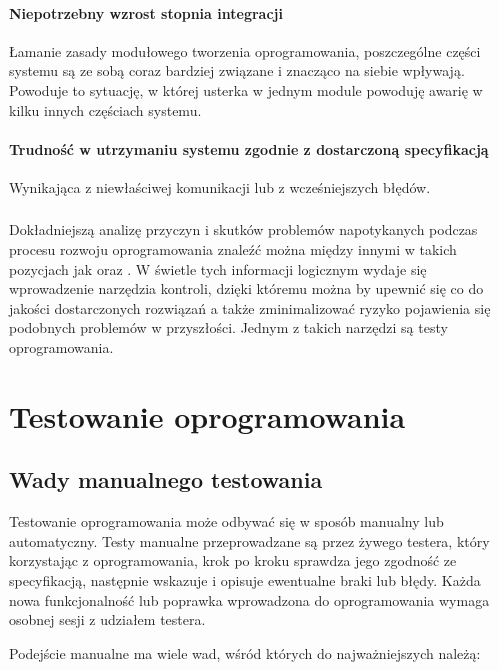 	  \paragraph{Niepotrzebny wzrost stopnia integracji}
	    Łamanie zasady modułowego tworzenia oprogramowania, poszczególne części systemu są ze sobą coraz bardziej związane i znacząco na siebie wpływają. Powoduje to sytuację, w której usterka w jednym module powoduję awarię w kilku innych częściach systemu.
	  \paragraph{Trudność w utrzymaniu systemu zgodnie z dostarczoną specyfikacją}
	    Wynikająca z niewłaściwej komunikacji lub z wcześniejszych błędów.
	
	\subsubsection{}
	Dokładniejszą analizę przyczyn i skutków problemów napotykanych podczas procesu rozwoju oprogramowania znaleźć można między innymi w takich pozycjach jak \cite{pragmatic_programmer} oraz \cite{rspec_book}.  W świetle tych informacji logicznym wydaje się wprowadzenie narzędzia kontroli, dzięki któremu można by upewnić się co do jakości dostarczonych rozwiązań a także zminimalizować ryzyko pojawienia się podobnych problemów w przyszłości. Jednym z takich narzędzi są testy oprogramowania.
	  
	\section{Testowanie oprogramowania}
	  \subsection{Wady manualnego testowania}
  	  Testowanie oprogramowania może odbywać się w sposób manualny lub automatyczny. Testy manualne przeprowadzane są przez żywego testera, który korzystając z oprogramowania, krok po kroku sprawdza jego zgodność ze specyfikacją, następnie wskazuje i opisuje ewentualne braki lub błędy. Każda nowa funkcjonalność lub poprawka wprowadzona do oprogramowania wymaga osobnej sesji z udziałem testera. 
	  
  	  Podejście manualne ma wiele wad, wśród których do najważniejszych należą:
	  
